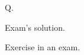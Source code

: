 \documentclass[solutions=true]{akizumi-exam}
\begin{document}
\begin{questions}
\question[5] Q.
\begin{solution}Exam's solution.\end{solution}
\end{questions}
\begin{exercise}Exercise in an exam.\end{exercise}
\end{document}
